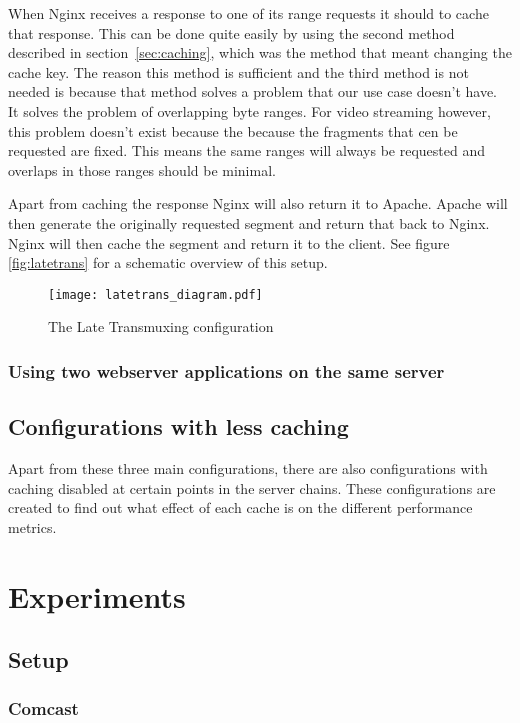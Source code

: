 \documentclass[twoside,openright]{uva-bachelor-thesis}
\begin{document}
When Nginx receives a response to one of its range requests it should to cache
that response. This can be done quite easily by using the second method
described in section~\vref{sec:caching}, which was the method that meant
changing the cache key. The reason this method is sufficient and the third
method is not needed is because that method solves a problem that our use case
doesn't have.  It solves the problem of overlapping byte ranges. For video
streaming however, this problem doesn't exist because the because the fragments
that cen be requested are fixed. This means the same ranges will always be
requested and overlaps in those ranges should be minimal.

Apart from caching the response Nginx will also return it to Apache. Apache will
then generate the originally requested segment and return that back to Nginx.
Nginx will then cache the segment and return it to the client. See figure
\vref{fig:latetrans} for a schematic overview of this setup.

\begin{figure}
    \texttt{[image: latetrans\_diagram.pdf]}
    \caption{The Late Transmuxing configuration}\label{fig:latetrans}
\end{figure}

\subsection{Using two webserver applications on the same server}


\section{Configurations with less caching}
Apart from these three main configurations, there are also configurations
with caching disabled at certain points in the server chains. These
configurations are created to find out what effect of each cache is on the
different performance metrics.






\chapter{Experiments}
\section{Setup}
\subsection{Comcast}
\end{document}
